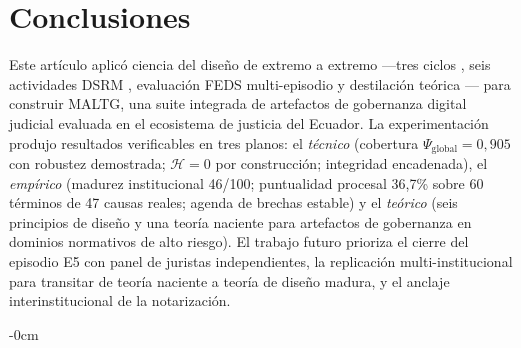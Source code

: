 \documentclass[computers,article,submit,pdftex,moreauthors]{Definitions/mdpi}
\begin{document}
\section{Conclusiones}
\label{sec:conclusions}

Este artículo aplicó ciencia del diseño de extremo a extremo ---tres ciclos \cite{Hevner2004}, seis actividades DSRM \cite{Peffers2007}, evaluación FEDS multi-episodio \cite{Venable2016} y destilación teórica \cite{Gregor2013,GregorJones2007}--- para construir MALTG, una suite integrada de artefactos de gobernanza digital judicial evaluada en el ecosistema de justicia del Ecuador. La experimentación produjo resultados verificables en tres planos: el \emph{técnico} (cobertura $\Psi_{\mathrm{global}} = 0{,}905$ con robustez demostrada; $\mathcal{H} = 0$ por construcción; integridad encadenada), el \emph{empírico} (madurez institucional 46/100; puntualidad procesal 36{,}7\% sobre 60 términos de 47 causas reales; agenda de brechas estable) y el \emph{teórico} (seis principios de diseño y una teoría naciente para artefactos de gobernanza en dominios normativos de alto riesgo). El trabajo futuro prioriza el cierre del episodio E5 con panel de juristas independientes, la replicación multi-institucional para transitar de teoría naciente a teoría de diseño madura, y el anclaje interinstitucional de la notarización.

\vspace{6pt}







\begin{adjustwidth}{-\extralength}{0cm}

\end{adjustwidth}
\end{document}
